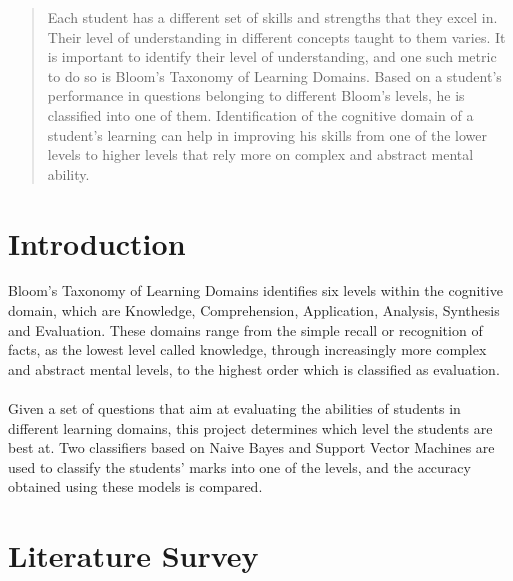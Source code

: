 \documentclass[12pt,oneside,a4paper]{article}
\providecommand\phantomsection{}
\begin{document}
	\null
	\vspace{\fill}

	\phantomsection
	\begin{abstract}
		\normalsize
		\doublespacing
		Each student has a different set of skills and strengths that they excel in. Their level of understanding in different concepts taught to them varies. It is important to identify their level of understanding, and one such metric to do so is Bloom’s Taxonomy of Learning Domains. Based on a student’s performance in questions belonging to different Bloom’s levels, he is classified into one of them. Identification of the cognitive domain of a student’s learning can help in improving his skills from one of the lower levels to higher levels that rely more on complex and abstract mental ability. 
	\end{abstract}

	\vspace{\fill}
	\null
	\newpage

	\section{Introduction}
		Bloom’s Taxonomy of Learning Domains identifies six levels within the cognitive domain, which are Knowledge, Comprehension, Application, Analysis, Synthesis and Evaluation. These domains range from the simple recall or recognition of facts, as the lowest level called knowledge, through increasingly more complex and abstract mental levels, to the highest order which is classified as evaluation. \\
		\\
		Given a set of questions that aim at evaluating the abilities of students in different learning domains, this project determines which level the students are best at. Two classifiers based on Naive Bayes and Support Vector Machines are used to classify the students’ marks into one of the levels, and the accuracy obtained using these models is compared. 



	\section{Literature Survey}
\end{document}
